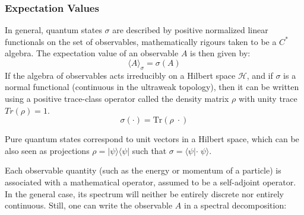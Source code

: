 \documentclass[twoside,a4paper,11pt]{article}
\numberwithin{equation}{section}
\begin{document}

\iffalse

\subsubsection{Expectation Values}
In general, quantum states $ \sigma$  are described by positive normalized linear functionals on the set of observables, mathematically rigours taken to be a $C^*$ algebra. The expectation value of an observable $A$ is then given by:
\begin{equation}
\langle A \rangle_\sigma = \sigma(A)
\end{equation}
If the algebra of observables acts irreducibly on a Hilbert space $\mathcal{H}$, and if $ \sigma$  is a normal functional (continuous in the ultraweak topology), then it can be written using a positive trace-class operator called the density matrix $\rho$  with unity trace $Tr(\rho) =1$.
\begin{equation}
    \sigma (\cdot) = \mathrm{Tr} (\rho \; \cdot)
\end{equation}


Pure quantum states correspond to unit vectors in a Hilbert space, which can be also seen as projections $\rho= |\psi\rangle\langle\psi|$ such that $\sigma = \langle \psi |\cdot \; \psi\rangle$.


Each observable quantity (such as the energy or momentum of a particle) is associated with a mathematical operator, assumed to be a self-adjoint operator. In the general case, its spectrum will neither be entirely discrete nor entirely continuous. Still, one can write the observable $A $ in a spectral decomposition:
\end{document}
